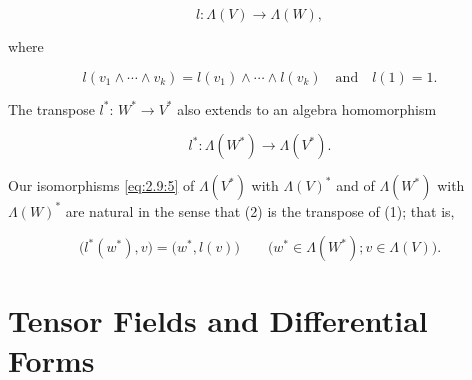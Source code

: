 \begin{equation}
\tag{1}\label{eq:2.13:1}
l\colon\Lambda(V)\to\Lambda(W),
\end{equation}

where

\[
l(v_{1}\wedge\cdots\wedge v_{k})=l(v_{1})\wedge\cdots\wedge l(v_{k})\quad\mathrm{and}\quad l(1)=1.
\]

The transpose  $ l^{*} $:  $ W^{*}\rightarrow V^{*} $ also extends to an algebra homomorphism

\begin{equation}
\tag{2}\label{eq:2.13:2}
l^{*}\colon\Lambda(W^{*})\to\Lambda(V^{*}).
\end{equation}

Our isomorphisms \eqref{eq:2.9:5} of  $ \Lambda(V^{*}) $ with  $ \Lambda(V)^{*} $ and of  $ \Lambda(W^{*}) $ with  $ \Lambda(W)^{*} $ are natural in the sense that (2) is the transpose of (1); that is,

\begin{equation}
\tag{3}\label{eq:2.13:3}
\big(l^{*}(w^{*}),v\big)=\big(w^{*},l(v)\big)\qquad\big(w^{*}\in\Lambda(W^{*});v\in\Lambda(V)\big).
\end{equation}

\section{Tensor Fields and Differential Forms}


